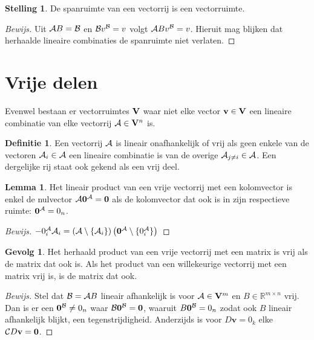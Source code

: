 \documentclass{amsart}
\theoremstyle{definition}
\newtheorem{thm}{Stelling}[section]
\newtheorem{lmm}{Lemma}[section]
\newtheorem{dfn}{Definitie}[section]
\newtheorem{csq}{Gevolg}[section]
\newenvironment{bewijs}{\begin{proof}[Bewijs]}{\end{proof}}
\newcommand{\setsm}[1]{\{{#1}\}}
\newcommand{\without}[1]{\setminus\setsm{#1}}
\newcommand{\realnums}{\mathbb{R}}
\newcommand{\realn}[1][n]{\realnums^{#1}}
\newcommand{\realmx}[2][n]{\realn[#2 \times #1]}
\newcommand{\realmxn}{\realmx{m}}
\newcommand{\vecspace}[1][v]{\mathrm{\mathbf{\MakeUppercase#1}}}
\newcommand{\vecspacen}[1][n]{\vecspace^#1}
\newcommand{\vvec}[1][v]{\mathbf{#1}}
\newcommand{\zerovec}{\vvec[0]}
\newcommand{\vecrow}[1][a]{\mathcal{\MakeUppercase{#1}}}
\newcommand{\rvec}[2][i]{{#2}_{#1}}
\newcommand{\rvecr}[2][i]{\rvec[#1]{\vecrow[#2]}}
\newcommand{\rveci}[1][i]{\rvecr[#1]{a}}
\newcommand{\cvec}[2]{{#1}^{#2}}
\newcommand{\cvecv}[2][v]{\cvec{\vvec[#1]}{#2}}
\newcommand{\cvecc}[2][a]{\cvecv[#2]{\vecrow[#1]}}
\newcommand{\cvecvv}[1][v]{\cvecc{#1}}
\newcommand{\vcord}[3]{{#1}_{#2}^{#3}}
\newcommand{\vcorda}[3][a]{\vcord{#2}{#3}{\vecrow[#1]}}
\newcommand{\vcordai}[2][i]{\vcorda{#2}{#1}}
\begin{document}
\begin{thm}
	De spanruimte van een vectorrij is een vectorruimte.
	\begin{bewijs}
		Uit $\vecrow B = \vecrow[b]$ en $\vecrow[b] v^{\vecrow[b]}= v$ volgt $\vecrow B v^{\vecrow[b]}= v$.
		Hieruit mag blijken dat herhaalde lineaire combinaties de spanruimte niet verlaten.
	\end{bewijs}
\end{thm}

\section{Vrije delen}

Evenwel bestaan er vectorruimtes $\vecspace$ waar niet elke vector $\vvec \in \vecspace$ een lineaire combinatie van elke vectorrij $\vecrow \in \vecspacen$ is.

\begin{dfn}
	Een vectorrij $\vecrow$ is lineair onafhankelijk of vrij als geen enkele van de vectoren $\vecrow_i \in \vecrow$ een lineaire combinatie is van de overige $\vecrow_{j\neq i} \in \vecrow$.
	Een dergelijke rij staat ook gekend als een vrij deel.
\end{dfn}

\begin{lmm}
	Het lineair product van een vrije vectorrij met een kolomvector is enkel de nulvector $\vecrow \cvecvv[0] = \zerovec$ als de kolomvector dat ook is in zijn respectieve ruimte: $\cvecvv[0] = 0_n$.
	\begin{bewijs}
		$-\vcordai 0 \vecrow_i = \left(\vecrow \without{\rveci}\right)\left(\cvecvv[0] \without{\vcordai 0}\right)$
	\end{bewijs}
\end{lmm}

\begin{csq}
	Het herhaald product van een vrije vectorrij met een matrix is vrij als de matrix dat ook is. Als het product van een willekeurige vectorrij met een matrix vrij is, is de matrix dat ook.
	\begin{bewijs}
		Stel dat $\vecrow[b] = \vecrow B$ lineair afhankelijk is voor $\vecrow \in \vecspacen[m]$ en $B \in \realmxn$ vrij.
		Dan is er een $\cvecc[b]{0} \neq 0_n$ waar $\vecrow[b] \cvecc[b]{0} = \zerovec$, waaruit $B \cvecc[b]{0} = 0_n$ zodat ook $B$ lineair afhankelijk blijkt, een tegenstrijdigheid.
		Anderzijds is voor $D\vvec = 0_k$ elke $\vecrow[c] D\vvec = \zerovec$.
	\end{bewijs}
\end{csq}
\end{document}
